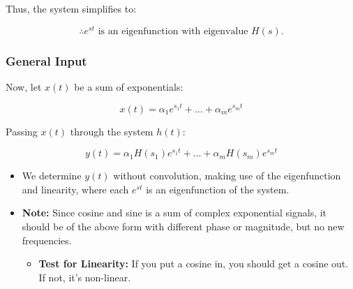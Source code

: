 \begin{derivation}
    Thus, the system simplifies to:

    \begin{center}
    \end{center}

    \[
    \therefore e^{st} \text{ is an eigenfunction with eigenvalue } H(s).
    \]
\end{derivation}

\subsubsection{General Input}
\begin{derivation}
    Now, let \( x(t) \) be a sum of exponentials:

    \[
    x(t) = \alpha_1 e^{s_1 t} + \dots + \alpha_m e^{s_m t}
    \]

    Passing \( x(t) \) through the system \( h(t) \):

    \begin{center}
    \end{center}

    \[
    y(t) = \alpha_1 H(s_1)e^{s_1 t} + \dots + \alpha_m H(s_m)e^{s_m t}
    \]
    \begin{itemize}
        \item We determine \( y(t) \) without convolution, making use of the eigenfunction and linearity, where each \( e^{st} \) is an eigenfunction of the system.
        \item \textbf{Note:} Since cosine and sine is a sum of complex exponential signals, it should be of the above form with different phase or magnitude, but no new frequencies.
        \begin{itemize}
            \item \textbf{Test for Linearity:} If you put a cosine in, you should get a cosine out. If not, it's non-linear. 
        \end{itemize}
    \end{itemize}
\end{derivation}

